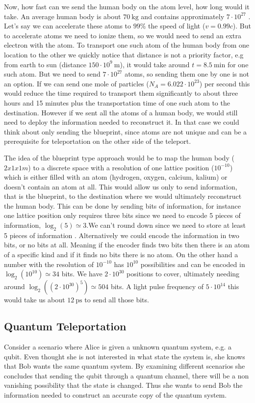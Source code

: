 \documentclass[a4paper]{article}
\begin{document}
Now, how fast can we send the human body on the atom level, how long would it
take. An average human body is about $70\ \text{kg}$ and contains
approximately $7\cdot 10^{27}$ \cite{body}.
Let's say we can accelerate these atoms to  $99\%$ the speed of light
($v=0.99c$). But to accelerate atoms we need to ionize them, so we would need
to send an extra electron with the atom.
To transport one such atom of the human body from one location to the other
we quickly notice that distance is not a priority factor, e.g from earth to sun
(distance $150\cdot10^9\ \text{m}$), it would take around $t = 8.5\ \text{min}$
for one such atom. But we need to send $7\cdot 10^{27}$ atoms, so sending them
one by one is not an option. If we can send one mole of particles ($N_A = 6.022
\cdot 10^{23}$)  per second this would reduce the time required to transport
them significantly to about three hours and 15 minutes plus the transportation
time of one such atom to the destination. However if we sent all the atoms of a
human body, we would still need to deploy the information needed to reconstruct
it. In that case we could think about only sending the blueprint, since atoms
are not unique and can be a prerequisite for teleportation
on the other side of the teleport.

The idea of the blueprint type approach would be to map the human body
($2x1x1m$) to a discrete space with a resolution of one lattice position
($10^{-10}$) which is either filled with an atom (hydrogen, oxygen, calcium,
kalium) or doesn't contain an atom at all.  This would allow us only to send
information, that is the blueprint, to the destination where we would
ultimately reconstruct the human body. This can be done by sending bits of
information, for instance one lattice position only requires three bits since
we need to encode 5 pieces of information, $\log_2(5) \simeq 3$.We can't round
down since we need to store at least 5 pieces of information . Alternatively we
could encode the information in two bits, or no bits at all. Meaning if the
encoder finds two bits then there is an atom of a specific kind and if it finds
no bits there is no atom. On the other hand a number with the resolution of
$10^{-10}$ has $10^{10}$ possibilities and can be encoded in $\log_2(10^{10})
\simeq 34$ bits. We have $2\cdot10^{30}$ positions to cover, ultimately needing
around $\log_2((2\cdot10^{30})^5) \simeq 504$ bits. A light pulse frequency of
$5\cdot 10^{14}$ this would take us about $12\ \text{ps}$ to send all those
bits.

\subsection{Quantum Teleportation}
Consider a scenario where Alice is given a unknown quantum system, e.g. a qubit.
Even thought she is not interested in what state the system is, she knows that
Bob wants the same quantum system. By examining different scenarios she
concludes that sending the qubit through a quantum channel, there will be a non
vanishing possibility that the state is changed. Thus she wants to send Bob the
information needed to construct an accurate copy of the quantum system.
\end{document}
